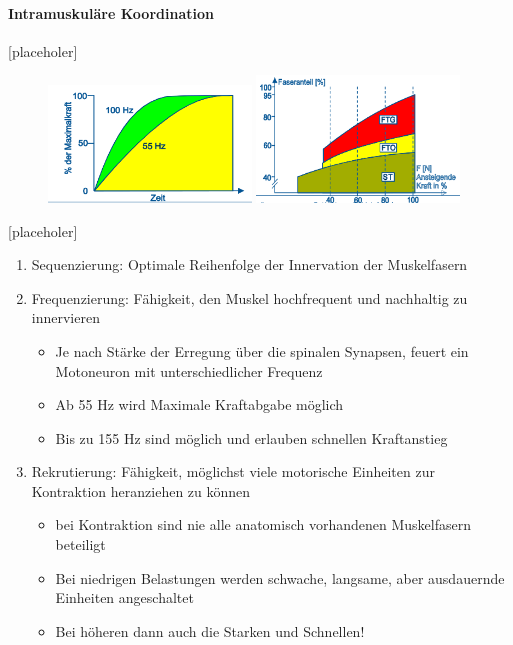 \paragraph{Intramuskuläre Koordination}

[placeholer]

\begin{figure}
    \includegraphics[width=0.48\textwidth]{pictures/frequenzierung}
    \includegraphics[width=0.48\textwidth]{pictures/rekrutierung}
\end{figure}

[placeholer]

\begin{enumerate}
    \item Sequenzierung: Optimale Reihenfolge der Innervation der Muskelfasern
    \item Frequenzierung: Fähigkeit, den Muskel hochfrequent und nachhaltig zu innervieren
    \begin{itemize}
        \item Je nach Stärke der Erregung über die spinalen Synapsen, feuert ein Motoneuron mit unterschiedlicher Frequenz
        \item  Ab 55 Hz wird Maximale Kraftabgabe möglich
        \item  Bis zu 155 Hz sind möglich und erlauben schnellen Kraftanstieg
    \end{itemize}
    \item Rekrutierung: Fähigkeit, möglichst viele motorische Einheiten zur Kontraktion heranziehen zu können
    \begin{itemize}
        \item bei Kontraktion sind nie alle anatomisch vorhandenen Muskelfasern beteiligt
        \item Bei niedrigen Belastungen werden schwache, langsame, aber ausdauernde Einheiten angeschaltet
        \item Bei höheren dann auch die Starken und Schnellen!
    \end{itemize}
\end{enumerate}

